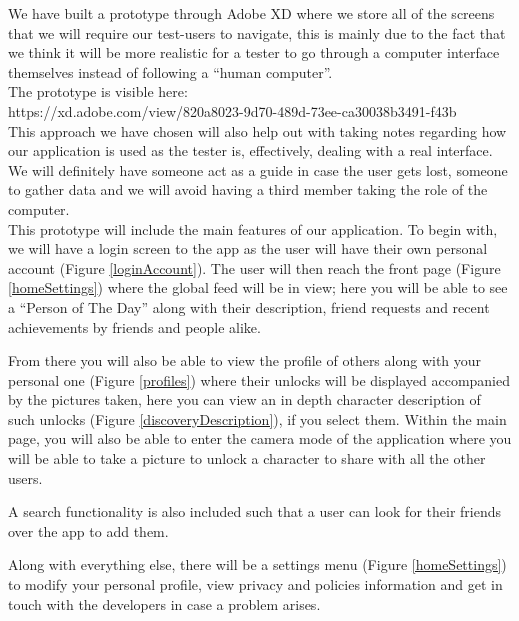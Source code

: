 \documentclass[12pt]{scrartcl}
\begin{document}
		
		We have built a prototype through Adobe XD where we store all of the screens that we will
		require our test-users to navigate, this is mainly due to the fact that we think it will be more
		realistic for a tester to go through a computer interface themselves instead of following a 
		``human computer''.\\
		
		The prototype is visible here:\\
		https://xd.adobe.com/view/820a8023-9d70-489d-73ee-ca30038b3491-f43b\\
		
		This approach we have chosen will also help out with taking notes regarding how our 
		application is used as the tester is, effectively, dealing with a real interface. We will definitely 
		have someone act as a guide in case the user gets lost, someone to gather data and we will 
		avoid having a third member taking the role of the computer.\\
	
		This prototype will include the main features of our application. To begin with, we will have a 
		login screen to the app as the user will have their own personal account (Figure
		\ref{loginAccount}). The user will then reach the front page (Figure \ref{homeSettings}) where 
		the global feed will be in view; here you will be able to see a ``Person of The  Day'' along with 
		their description, friend requests and recent achievements by friends and  people alike. 
	
		From there you will also be able to view the profile of others along with your personal one 
		(Figure \ref{profiles}) where their unlocks will be displayed accompanied by the pictures taken, 
		here you can view an in depth  character description of such unlocks (Figure 
		\ref{discoveryDescription}), if you select them. Within the main page, you will also be able to 
		enter the camera mode of the application where you will be able to take a picture to unlock a 
		character to share with all the other users.
	
		A search functionality is also included such that a user can look for their friends over the app
		to add them.
	
		Along with everything else, there will be a settings menu (Figure \ref{homeSettings}) to modify 
		your personal profile, view privacy and policies information and get in touch with the developers 
		in case a problem arises.
		
\end{document}
